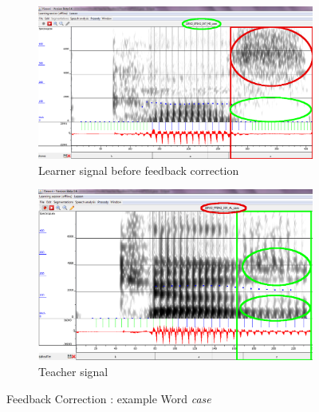 \documentclass[11pt]{beamer}
\begin{document}
\begin{frame}

\begin{figure}
\begin{subfigure}{.5\textwidth}
  \centering
  \includegraphics[width=0.9\linewidth]{images/case_learner-changed2.PNG}
  \caption{Learner signal before feedback correction}
  \label{fig:sfig1}
\end{subfigure}%
\begin{subfigure}{.5\textwidth}
  \centering
  \includegraphics[width=0.9\linewidth]{images/teacher_case_changed2.PNG}
  \caption{Teacher signal}
  \label{fig:sfig2}
\end{subfigure}
\caption{Feedback Correction : example Word \emph{case}}
\label{fig:fig}
\end{figure}
\end{frame}
\end{document}
